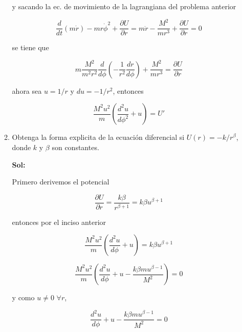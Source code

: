 \documentclass[12pt,a4paper]{article}
\begin{document}
\begin{enumerate}
\begin{enumerate}
    y sacando la ec. de movimiento de la lagrangiana del problema anterior
    
    \begin{equation*}
        \frac{d}{dt} \left(m\dot{r}\right)- mr \dot{\phi}^2 + \frac{\partial U}{\partial r} =m\ddot{r}- \frac{M^2}{m r^3} + \frac{\partial U}{\partial r} =0
    \end{equation*}
    
    se tiene que
    
    \begin{equation*}
        m \frac{M^2}{m^2 r^2} \frac{d}{d \phi} \left(-\frac{1}{r^2}\frac{dr}{d \phi}\right) + \frac{M^2}{m r^3} = \frac{\partial U}{\partial r}
    \end{equation*}
    
    ahora sea $u = 1/r$ y $du = - 1/r^2$, entonces
    
    \begin{equation*}
        \frac{M^2 u^2}{m} (\frac{d^2 u}{d \phi^2} + u) = U'
    \end{equation*}
    
    
    
    
    
    \item Obtenga la forma explicita de la ecuación diferencial si $U(r) = -k/r^{\beta}$, donde $k$ y $\beta$ son constantes.
    
    \textbf{Sol:}
    
    Primero derivemos el potencial
    
    \begin{equation*}
        \frac{\partial U}{\partial r} = \frac{k\beta}{r^{\beta + 1}} = k \beta u^{\beta + 1}
    \end{equation*}
    
    entonces por el inciso anterior
    
    \begin{equation*}
    \frac{M^2u^2}{m} \left(\frac{d^2 u}{d \phi} + u\right) = k \beta  u^{\beta + 1}
    \end{equation*}
    
    \begin{equation*}
        \frac{M^2u^2}{m} \left(\frac{d^2 u}{d \phi} + u - \frac{k\beta m u^{\beta -1}}{M^2}\right) = 0
    \end{equation*}
    
    y como $u \neq 0$ $\forall r$,
    
    \begin{equation*}
        \frac{d^2 u}{d \phi} + u - \frac{k\beta m u^{\beta -1}}{M^2} = 0
    \end{equation*}
    

\end{enumerate}
\end{enumerate}
\end{document}
